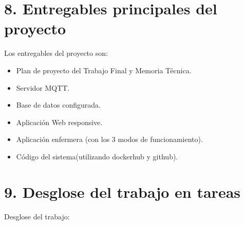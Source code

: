 \documentclass[
11pt, %
]{charter}
\begin{document}
\section{8. Entregables principales del proyecto}
\label{sec:entregables}



Los entregables del proyecto son:

\begin{itemize}
	\item Plan de proyecto del Trabajo Final y Memoria Técnica.
	\item Servidor MQTT.
	\item Base de datos configurada.
	\item Aplicación Web responsive.
	\item Aplicación enfermera (con los 3 modos de funcionamiento).
	\item Código del sistema(utilizando dockerhub y github).
\end{itemize}

\section{9. Desglose del trabajo en tareas}
\label{sec:wbs}

Desglose del trabajo:
\end{document}

